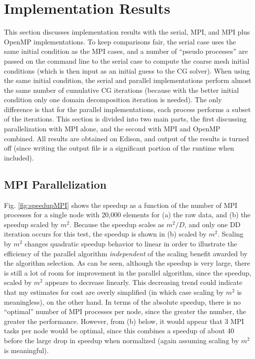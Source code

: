 \documentclass[10pt]{article}
\begin{document}
\section{Implementation Results}
This section discusses implementation results with the serial, MPI, and MPI plus OpenMP implementations. To keep comparisons fair, the serial case uses the same initial condition as the MPI cases, and a number of ``pseudo processes'' are passed on the command line to the serial case to compute the coarse mesh initial conditions (which is then input as an initial guess to the CG solver). When using the same initial condition, the serial and parallel implementations perform almost the same number of cumulative CG iterations (because with the better initial condition only one domain decomposition iteration is needed). The only difference is that for the parallel implementations, each process performs a subset of the iterations. This section is divided into two main parts, the first discussing parallelization with MPI alone, and the second with MPI and OpenMP combined. All results are obtained on Edison, and output of the results is turned off (since writing the output file is a significant portion of the runtime when included).

\subsection{MPI Parallelization}

Fig. \ref{fig:speedupMPI} shows the speedup as a function of the number of MPI processes for a single node with 20,000 elements for (a) the raw data, and (b) the speedup scaled by \(m^2\). Because the speedup scales as \(m^2/D\), and only one DD iteration occurs for this test, the speedup is shown in (b) scaled by \(m^2\). Scaling by \(m^2\) changes quadratic speedup behavior to linear in order to illustrate the efficiency of the parallel algorithm {\it independent} of the scaling benefit awarded by the algorithm selection. As can be seen, although the speedup is very large, there is still a lot of room for improvement in the parallel algorithm, since the speedup, scaled by \(m^2\) appears to decrease linearly. This decreasing trend could indicate that my estimates for cost are overly simplified (in which case scaling by \(m^2\) is meaningless), on the other hand. In terms of the absolute speedup, there is no ``optimal'' number of MPI processes per node, since the greater the number, the greater the performance. However, from (b) below, it would appear that 3 MPI tasks per node would be optimal, since this combines a speedup of about 40 before the large drop in speedup when normalized (again assuming scaling by \(m^2\) is meaningful). 
\end{document}
